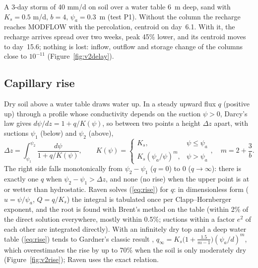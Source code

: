 \begin{example}
A 3-day storm of 40 mm/d on soil over a water table 6~m deep, sand with $K_s=0.5$ m/d, $b=4$, $\psi_a=0.3$~m (test P1).
Without the column the recharge reaches MODFLOW with the percolation, centroid on day~6.1. With it, the recharge
arrives spread over two weeks, peak 45\% lower, and its centroid moves to day~15.6; nothing is lost: inflow, outflow
and storage change of the columns close to $10^{-11}$ (Figure~\ref{fig:v2delay}).
\end{example}





\subsection{Capillary rise}\label{sec:szcaprise}
Dry soil above a water table draws water up. In a steady upward flux $q$ (positive up) through a profile whose
conductivity depends on the suction $\psi>0$, Darcy's law gives $d\psi/dz=1+q/K(\psi)$, so between two points a height
$\Delta z$ apart, with suctions $\psi_1$ (below) and $\psi_2$ (above),
\begin{equation}\label{eq:rise}
\Delta z=\int_{\psi_1}^{\psi_2}\frac{d\psi}{1+q/K(\psi)},\qquad K(\psi)=\begin{cases}K_s,&\psi\le\psi_a\\K_s(\psi_a/\psi)^m,&\psi>\psi_a\end{cases},\quad m=2+\frac3b .
\end{equation}
The right side falls monotonically from $\psi_2-\psi_1$ ($q=0$) to 0 ($q\to\infty$): there is exactly one $q$ when
$\psi_2-\psi_1>\Delta z$, and none (no rise) when the upper point is at or wetter than hydrostatic. Raven solves
(\ref{eq:rise}) for $q$: in dimensionless form ($u=\psi/\psi_a$, $Q=q/K_s$) the integral is tabulated once per
Clapp--Hornberger exponent, and the root is found with Brent's method on the table (within 2\% of the direct solution
everywhere, mostly within 0.5\%; suctions within a factor $e^2$ of each other are integrated directly). With an
infinitely dry top and a deep water table (\ref{eq:rise}) tends to Gardner's classic result
\cite{gardner1958,eagleson1978}, $q_\infty=K_s\big(1+\tfrac{1.5}{m-1}\big)(\psi_a/d)^m$, which overestimates the rise by
up to 70\% when the soil is only moderately dry (Figure~\ref{fig:v2rise}); Raven uses the exact relation.

